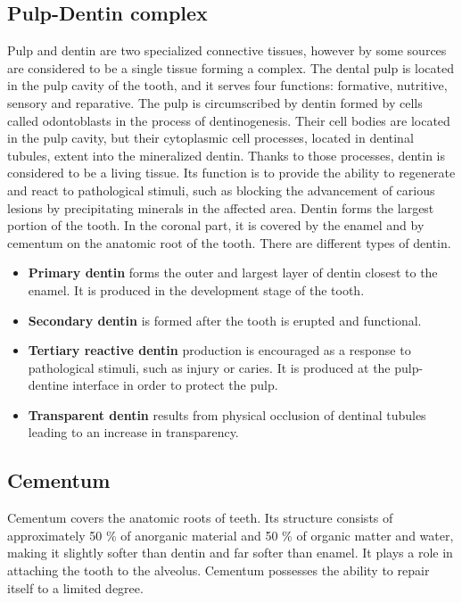\subsection*{Pulp-Dentin complex}
Pulp and dentin are two specialized connective tissues, however by some sources are considered to be a single tissue forming a complex.
The dental pulp is located in the pulp cavity of the tooth, and it serves four functions: formative, nutritive, sensory and reparative.
The pulp is circumscribed by dentin formed by cells called odontoblasts in the process of dentinogenesis. Their cell bodies are located in the pulp cavity, but their cytoplasmic cell processes, located in dentinal tubules, extent into the mineralized dentin. Thanks to those processes, dentin is considered to be a living tissue. Its function is to provide the ability to regenerate and react to pathological stimuli, such as blocking the advancement of carious lesions by precipitating minerals in the affected area.
Dentin forms the largest portion of the tooth. In the coronal part, it is covered by the enamel and by cementum on the anatomic root of the tooth. There are different types of dentin.
\begin{itemize}
    \item \textbf{Primary dentin} forms the outer and largest layer of dentin closest to the enamel. It is produced in the development stage of the tooth.
    \item \textbf {Secondary dentin} is formed after the tooth is erupted and functional.
    \item \textbf{Tertiary reactive dentin} production is encouraged as a response to pathological stimuli, such as injury or caries. It is produced at the pulp-dentine interface in order to protect the pulp.
    \item \textbf{Transparent dentin} results from physical occlusion of dentinal tubules leading to an increase in transparency.
\end{itemize}


\subsection*{Cementum}
Cementum covers the anatomic roots of teeth. Its structure consists of approximately 50 \% of anorganic material and 50 \% of organic matter and water, making it slightly softer than dentin and far softer than enamel. It plays a role in attaching the tooth to the alveolus. Cementum possesses the ability to repair itself to a limited degree.

